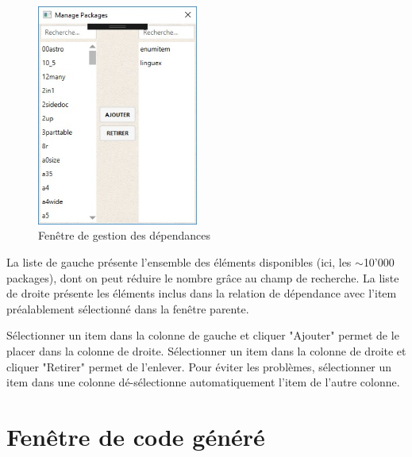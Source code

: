 \documentclass[a4paper, oneside]{article}
\begin{document}
\begin{figure}[htbp]
\centering
\includegraphics[width=200px]{../Images/packages.jpg}
\caption{\label{fig:orga7d6348}
Fenêtre de gestion des dépendances}
\end{figure}

La liste de gauche présente l'ensemble des éléments disponibles (ici,
les \(\sim\)10'000
packages), dont on peut réduire le nombre grâce au champ de recherche. La liste
de droite présente les éléments inclus dans la relation de dépendance avec
l'item préalablement sélectionné dans la fenêtre parente.

Sélectionner un item dans la colonne de gauche et cliquer "Ajouter" permet de le
placer dans la colonne de droite. Sélectionner un item dans la colonne de droite
et cliquer "Retirer" permet de l'enlever. Pour éviter les problèmes,
sélectionner un item dans une colonne dé-sélectionne automatiquement l'item de
l'autre colonne.

\section{Fenêtre de code généré}
\label{sec:orgf3f4103}
\label{org28f775d}
\end{document}
